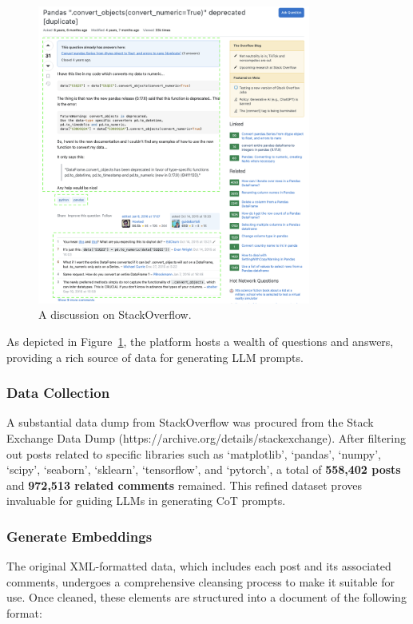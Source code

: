 \documentclass[a4paper,oneside]{book}
\begin{document}
\begin{figure}[H]
    \centering
    \includegraphics[width=0.8\textwidth]{img/stackoverflow}
    \caption{A discussion on StackOverflow.}\label{fig:stackoverflow}
\end{figure}

As depicted in Figure~\ref{fig:stackoverflow}, the platform hosts a wealth of questions and answers, providing a rich source of data for generating LLM prompts.

\subsubsection{Data Collection}
A substantial data dump from StackOverflow was procured from the Stack Exchange Data Dump (https://archive.org/details/stackexchange). After filtering out posts related to specific libraries such as `matplotlib', `pandas', `numpy', `scipy', `seaborn', `sklearn', `tensorflow', and `pytorch', a total of \textbf{558,402 posts} and \textbf{972,513 related comments} remained. This refined dataset proves invaluable for guiding LLMs in generating CoT prompts.

\subsubsection{Generate Embeddings}
The original XML-formatted data, which includes each post and its associated comments, undergoes a comprehensive cleansing process to make it suitable for use. Once cleaned, these elements are structured into a document of the following format:
\end{document}
